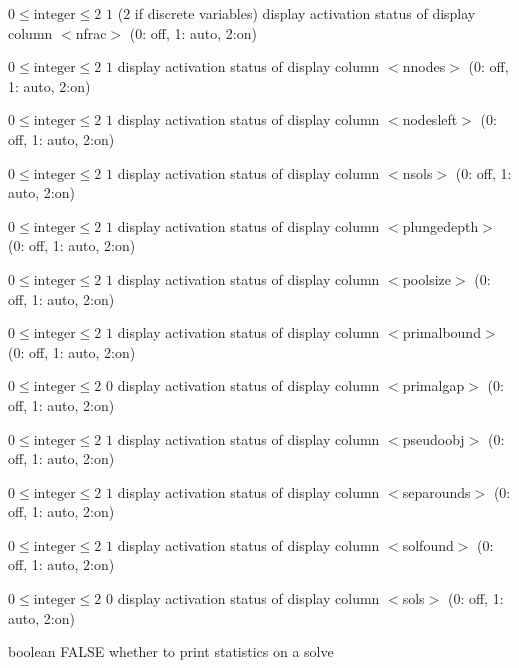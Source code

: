 %
{$0\leq\textrm{integer}\leq2$}%
{$1$ ($2$ if discrete variables)}%
{display activation status of display column $<$nfrac$>$ (0: off, 1: auto, 2:on)}%
{}

%
{$0\leq\textrm{integer}\leq2$}%
{$1$}%
{display activation status of display column $<$nnodes$>$ (0: off, 1: auto, 2:on)}%
{}

%
{$0\leq\textrm{integer}\leq2$}%
{$1$}%
{display activation status of display column $<$nodesleft$>$ (0: off, 1: auto, 2:on)}%
{}

%
{$0\leq\textrm{integer}\leq2$}%
{$1$}%
{display activation status of display column $<$nsols$>$ (0: off, 1: auto, 2:on)}%
{}

%
{$0\leq\textrm{integer}\leq2$}%
{$1$}%
{display activation status of display column $<$plungedepth$>$ (0: off, 1: auto, 2:on)}%
{}

%
{$0\leq\textrm{integer}\leq2$}%
{$1$}%
{display activation status of display column $<$poolsize$>$ (0: off, 1: auto, 2:on)}%
{}

%
{$0\leq\textrm{integer}\leq2$}%
{$1$}%
{display activation status of display column $<$primalbound$>$ (0: off, 1: auto, 2:on)}%
{}

%
{$0\leq\textrm{integer}\leq2$}%
{$0$}%
{display activation status of display column $<$primalgap$>$ (0: off, 1: auto, 2:on)}%
{}

%
{$0\leq\textrm{integer}\leq2$}%
{$1$}%
{display activation status of display column $<$pseudoobj$>$ (0: off, 1: auto, 2:on)}%
{}

%
{$0\leq\textrm{integer}\leq2$}%
{$1$}%
{display activation status of display column $<$separounds$>$ (0: off, 1: auto, 2:on)}%
{}

%
{$0\leq\textrm{integer}\leq2$}%
{$1$}%
{display activation status of display column $<$solfound$>$ (0: off, 1: auto, 2:on)}%
{}

%
{$0\leq\textrm{integer}\leq2$}%
{$0$}%
{display activation status of display column $<$sols$>$ (0: off, 1: auto, 2:on)}%
{}

%
{boolean}%
{FALSE}%
{whether to print statistics on a solve}%
{}

